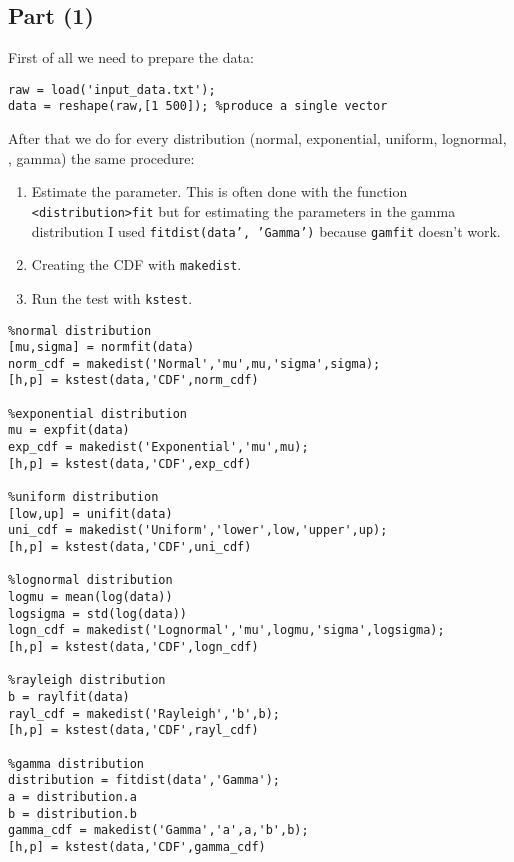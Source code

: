\documentclass[british,a4paper,order=firstname]{mathscript}
\begin{document}
\subsection{Part (1)}
First of all we need to prepare the data:
\begin{lstlisting}
raw = load('input_data.txt');
data = reshape(raw,[1 500]); %produce a single vector
\end{lstlisting}
After that we do for every distribution (normal, exponential, uniform, lognormal, , gamma) the same procedure: 
\begin{enumerate}[label=\textbf{\arabic*.}]
	\item Estimate the parameter. This is often done with the function \texttt{<distribution>fit} but for estimating the parameters in the gamma distribution I used \texttt{fitdist(data', 'Gamma')} because \texttt{gamfit} doesn't work.
	\item Creating the CDF with \texttt{makedist}.
	\item Run the  test with \texttt{kstest}.
\end{enumerate}
\begin{lstlisting}
%normal distribution
[mu,sigma] = normfit(data)
norm_cdf = makedist('Normal','mu',mu,'sigma',sigma);
[h,p] = kstest(data,'CDF',norm_cdf)

%exponential distribution
mu = expfit(data)
exp_cdf = makedist('Exponential','mu',mu);
[h,p] = kstest(data,'CDF',exp_cdf)

%uniform distribution
[low,up] = unifit(data)
uni_cdf = makedist('Uniform','lower',low,'upper',up);
[h,p] = kstest(data,'CDF',uni_cdf)

%lognormal distribution
logmu = mean(log(data))
logsigma = std(log(data))
logn_cdf = makedist('Lognormal','mu',logmu,'sigma',logsigma);
[h,p] = kstest(data,'CDF',logn_cdf)

%rayleigh distribution
b = raylfit(data)
rayl_cdf = makedist('Rayleigh','b',b);
[h,p] = kstest(data,'CDF',rayl_cdf)

%gamma distribution
distribution = fitdist(data','Gamma');
a = distribution.a
b = distribution.b
gamma_cdf = makedist('Gamma','a',a,'b',b);
[h,p] = kstest(data,'CDF',gamma_cdf)
\end{lstlisting}
\end{document}
